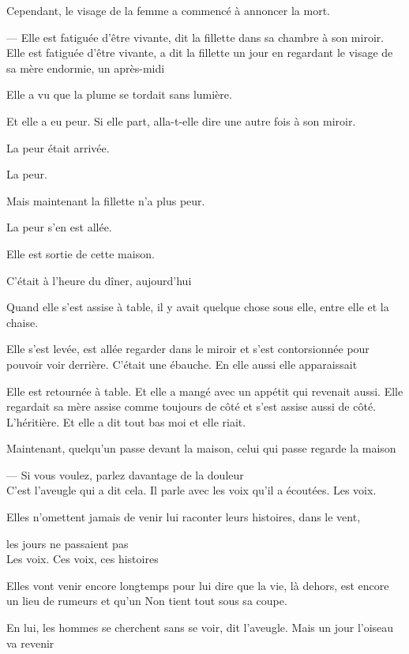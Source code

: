 Cependant, le visage de la femme a commencé à annoncer la mort.

--- Elle est fatiguée d'être vivante, dit la fillette dans sa chambre à
son miroir. Elle est fatiguée d'être vivante, a dit la fillette un jour
en regardant le visage de sa mère endormie, un après-midi

Elle a vu que la plume se tordait sans lumière.

Et elle a eu peur. Si elle part, alla-t-elle dire une autre fois à son
miroir.

La peur était arrivée.

La peur.

Mais maintenant la fillette n'a plus peur.

La peur s'en est allée.

Elle est sortie de cette maison.

C'était à l'heure du dîner, aujourd'hui

Quand elle s'est assise à table, il y avait quelque chose sous elle,
entre elle et la chaise.

Elle s'est levée, est allée regarder dans le miroir et s'est
contorsionnée pour pouvoir voir derrière. C'était une ébauche. En elle
aussi elle apparaissait

Elle est retournée à table. Et elle a mangé avec un appétit qui revenait
aussi. Elle regardait sa mère assise comme toujours de côté et s'est
assise aussi de côté. L'héritière. Et elle a dit tout bas moi et elle
riait.

Maintenant, quelqu'un passe devant la maison, celui qui passe regarde la
maison

\pagebreak

\vspace*{4cm}

--- Si vous voulez, parlez davantage de la douleur\\

C'est l'aveugle qui a dit cela. Il parle avec les voix qu'il a écoutées.
Les voix.

Elles n'omettent jamais de venir lui raconter leurs histoires, dans le
vent,

les jours ne passaient pas\\

Les voix. Ces voix, ces histoires

Elles vont venir encore longtemps pour lui dire que la vie, là dehors,
est encore un lieu de rumeurs et qu'un Non tient tout sous sa coupe.

En lui, les hommes se cherchent sans se voir, dit l'aveugle. Mais un
jour l'oiseau va revenir


